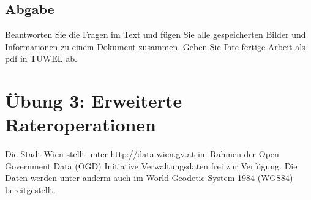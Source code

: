 \documentclass[a4paper,12pt,ngerman]{sphinxmanual}
\begin{document}
\section{Abgabe}
\label{uebung2:abgabe}
Beantworten Sie die Fragen im Text und fügen Sie alle gespeicherten Bilder und Informationen zu einem Dokument zusammen. Geben Sie Ihre fertige Arbeit als pdf in TUWEL ab.


\chapter{Übung 3: Erweiterte Rateroperationen}
\label{uebung3:ubung-3-erweiterte-rateroperationen}\label{uebung3::doc}
Die Stadt Wien stellt unter \href{http://data.wien.gv.at}{http://data.wien.gv.at} im Rahmen der Open Government Data (OGD) Initiative Verwaltungsdaten frei zur Verfügung. Die Daten werden unter anderm auch im World Geodetic System 1984 (WGS84) bereitgestellt.
\end{document}
